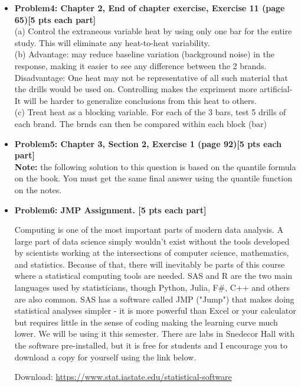 \documentclass[11pt]{article}\usepackage[]{graphicx}\usepackage[]{color}
\begin{document}
\begin{itemize}
\item \textbf{Problem4: Chapter 2, End of chapter exercise, Exercise 11 (page 65)[5 pts each part]}\\
(a) Control the extraneous variable heat by using only one bar for the entire study. This will eliminate any heat-to-heat variability.\\
(b) Advantage: may reduce baseline variation (background noise) in the response, making it easier to see any difference between the 2 brands. \\
Disadvantage: One heat may not be representative of all such material that the drills would be used on. 
Controlling makes the expriment more artificial- It will be harder to generalize conclusions from this heat to others.\\
(c) Treat heat as a blocking variable. For each of the 3 bars, test 5 drills of each brand. The brnds can then be compared within each block (bar)
\item \textbf{Problem5: Chapter 3, Section 2,  Exercise 1 (page 92)[5 pts each part]}\vspace{0.5cm}\\

\textbf{Note:} the following solution to this question is based on the quantile formula on the book. You must get the same final answer using the quantile function on the notes. 

\item \textbf{Problem6: JMP Assignment. [5 pts each part]} 

   Computing is one of the most important parts of modern data analysis. A large part of data science simply wouldn't exist without the tools developed by scientists working at the intersections of computer science, mathematics, and statistics. 
   Because of that, there will inevitably be parts of this course where a statistical computing tools are needed. SAS and R are the two main languages used by statisticians, though Python, Julia, F\#, C++ and others are also common.
   SAS has a software called JMP ("Jump") that makes doing statistical analyses simpler - it is more powerful than Excel or your calculator but requires little in the sense of coding making the learning curve much lower. 
   We will be using it this semester. There are labs in Snedecor Hall with the software pre-installed, but it is free for students and I encourage you to download a copy for yourself using the link below.

   Download: \href{https://www.stat.iastate.edu/statistical-software}{https://www.stat.iastate.edu/statistical-software}


\end{itemize}
\end{document}
